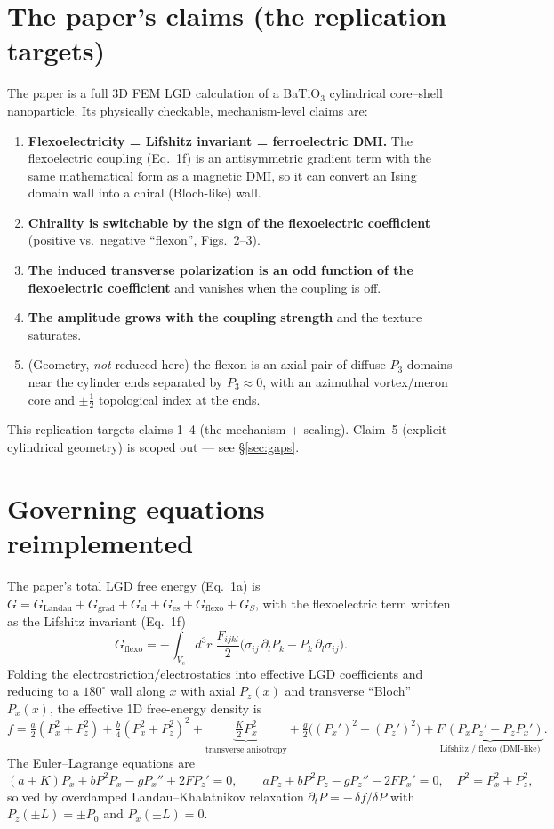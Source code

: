 \documentclass[11pt]{article}
\begin{document}
\section{The paper's claims (the replication targets)}
The paper is a full 3D FEM LGD calculation of a BaTiO$_3$ cylindrical core--shell
nanoparticle. Its physically checkable, mechanism-level claims are:
\begin{enumerate}
  \item \textbf{Flexoelectricity = Lifshitz invariant = ferroelectric DMI.} The
    flexoelectric coupling (Eq.~1f) is an antisymmetric gradient term with the
    same mathematical form as a magnetic DMI, so it can convert an Ising domain
    wall into a chiral (Bloch-like) wall.
  \item \textbf{Chirality is switchable by the sign of the flexoelectric
    coefficient} (positive vs.\ negative ``flexon'', Figs.~2--3).
  \item \textbf{The induced transverse polarization is an odd function of the
    flexoelectric coefficient} and vanishes when the coupling is off.
  \item \textbf{The amplitude grows with the coupling strength} and the texture
    saturates.
  \item (Geometry, \emph{not} reduced here) the flexon is an axial pair of
    diffuse $P_3$ domains near the cylinder ends separated by $P_3\approx 0$,
    with an azimuthal vortex/meron core and $\pm\tfrac12$ topological index at
    the ends.
\end{enumerate}
This replication targets claims 1--4 (the mechanism + scaling). Claim~5
(explicit cylindrical geometry) is scoped out --- see \S\ref{sec:gaps}.

\section{Governing equations reimplemented}
The paper's total LGD free energy (Eq.~1a) is
$G = G_{\mathrm{Landau}}+G_{\mathrm{grad}}+G_{\mathrm{el}}+G_{\mathrm{es}}
+G_{\mathrm{flexo}}+G_S$,
with the flexoelectric term written as the Lifshitz invariant (Eq.~1f)
\[
G_{\mathrm{flexo}} = -\int_{V_c} d^3r\;\frac{F_{ijkl}}{2}
   \Big(\sigma_{ij}\,\partial_l P_k - P_k\,\partial_l \sigma_{ij}\Big).
\]
Folding the electrostriction/electrostatics into effective LGD coefficients and
reducing to a $180^\circ$ wall along $x$ with axial $P_z(x)$ and transverse
``Bloch'' $P_x(x)$, the effective 1D free-energy density is
\[
f = \tfrac{a}{2}(P_x^2+P_z^2) + \tfrac{b}{4}(P_x^2+P_z^2)^2
    + \underbrace{\tfrac{K}{2} P_x^2}_{\text{transverse anisotropy}}
    + \tfrac{g}{2}\big((P_x')^2+(P_z')^2\big)
    + \underbrace{F\,(P_x P_z' - P_z P_x')}_{\text{Lifshitz / flexo (DMI-like)}} .
\]
The Euler--Lagrange equations are
\[
(a+K)P_x + b P^2 P_x - g P_x'' + 2F P_z' = 0,\qquad
a P_z + b P^2 P_z - g P_z'' - 2F P_x' = 0,\quad P^2=P_x^2+P_z^2,
\]
solved by overdamped Landau--Khalatnikov relaxation
$\partial_t P = -\,\delta f/\delta P$ with $P_z(\pm L)=\pm P_0$ and
$P_x(\pm L)=0$.
\end{document}
